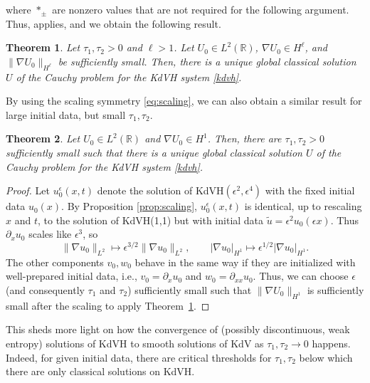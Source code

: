 \documentclass{article}
\theoremstyle{plain}
\newtheorem{theorem}{Theorem}
\theoremstyle{definition}
\numberwithin{theorem}{section}
\begin{document}
where $*_\pm$ are nonzero values that are not required for the following argument.
Thus, \cite[Theorem~5.2.1]{dafermos2010hyperbolic} applies, and we obtain the following result.
\begin{theorem}
\label{thm:small_data}
    Let
    $\tau_1, \tau_2 > 0$ and $\ell > 1$.
    Let $U_0 \in L^2(\mathbb{R})$,
    $\nabla U_0 \in H^\ell$, and
    $\|\nabla U_0\|_{H^\ell}$ be sufficiently small.
    Then, there is a unique global classical solution $U$ of the Cauchy problem for the KdVH system \eqref{kdvh}.
\end{theorem}

By using the scaling symmetry \eqref{eq:scaling}, we can also obtain a similar result for large initial data, but small $\tau_1, \tau_2$.
\begin{theorem}
\label{thm:small_tau}
    Let
    $U_0 \in L^2(\mathbb{R})$ and
    $\nabla U_0 \in H^1$.
    Then, there are $\tau_1, \tau_2 > 0$ sufficiently small such that
    there is a unique global classical solution $U$ of the Cauchy problem for the KdVH system \eqref{kdvh}.
\end{theorem}
\begin{proof}
    Let $u_0^\epsilon(x,t)$ denote the solution of
    KdVH$(\epsilon^2,\epsilon^4)$ with the fixed initial data $u_0(x)$.  By
    Proposition \ref{prop:scaling}, $u_0^\epsilon(x,t)$ is identical, up to
    rescaling $x$ and $t$, to the solution of KdVH(1,1) but with initial data
    $\tilde{u} = \epsilon^2 u_0(\epsilon x)$.  Thus $\partial_x u_0$ scales like $\epsilon^3$,
    so
    \begin{equation}
        \| \nabla u_0 \|_{L^2} \mapsto \epsilon^{3/2} \| \nabla u_0 \|_{L^2}, \qquad
        | \nabla u_0 |_{H^1} \mapsto \epsilon^{1/2} | \nabla u_0 |_{H^1}.
    \end{equation}
    The other components $v_0, w_0$ behave in the same way if they are initialized with well-prepared initial data, i.e., $v_0 = \partial_x u_0$ and $w_0 = \partial_{xx} u_0$.
    Thus, we can choose $\epsilon$ (and consequently $\tau_1$ and $\tau_2$) sufficiently small such that $\|\nabla U_0\|_{H^1}$ is sufficiently small after the scaling to apply Theorem~\ref{thm:small_data}.
\end{proof}

This sheds more light on how the convergence of (possibly discontinuous, weak entropy) solutions of KdVH to smooth solutions of KdV as $\tau_1, \tau_2 \to 0$ \cite[Theorem~3.2]{giesselmann2025convergence} happens.
Indeed, for given initial data, there are critical thresholds for $\tau_1, \tau_2$ below which there are only classical solutions on KdVH.
\end{document}

